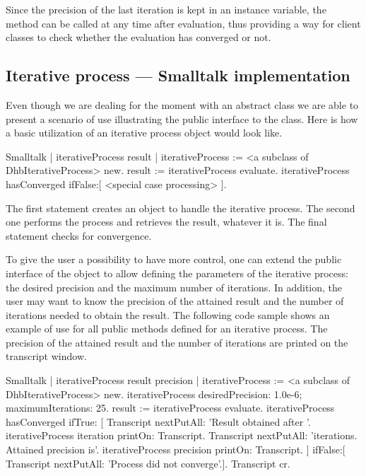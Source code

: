 Since the precision of the last iteration is kept in an instance
variable, the method  can be called at any time
after evaluation, thus providing a way for client classes to check
whether the evaluation has converged or not.

\subsection{Iterative process --- Smalltalk implementation}
\label{sec:siteration}
Even though we are dealing for the moment
with an abstract class we are able to present a scenario of use
illustrating the public interface to the class. Here is how a
basic utilization of an iterative process object would look like.
\begin{displaycode}{Smalltalk}
| iterativeProcess result |
iterativeProcess := <a subclass of DhbIterativeProcess> new.
result := iterativeProcess evaluate.
iterativeProcess hasConverged
   ifFalse:[ <special case processing> ].
\end{displaycode}

The first statement creates an object to handle the iterative
process. The second one performs the process and retrieves the
result, whatever it is. The final statement checks for
convergence.

To give the user a possibility to have more control, one can
extend the public interface of the object to allow defining the
parameters of the iterative process: the desired precision and the
maximum number of iterations. In addition, the user may want to
know the precision of the attained result and the number of
iterations needed to obtain the result. The following code sample
shows an example of use for all public methods defined for an
iterative process. The precision of the attained result and the
number of iterations are printed on the transcript window.

\begin{displaycode}{Smalltalk}
| iterativeProcess result precision |
iterativeProcess := <a subclass of DhbIterativeProcess> new.
iterativeProcess desiredPrecision: 1.0e-6; maximumIterations: 25.
result := iterativeProcess evaluate.
iterativeProcess hasConverged
   ifTrue: [ Transcript nextPutAll: 'Result obtained after '.
             iterativeProcess iteration printOn: Transcript.
             Transcript nextPutAll: 'iterations. Attained precision is'.
             iterativeProcess precision printOn: Transcript.
             ]
    ifFalse:[ Transcript nextPutAll: 'Process did not converge'.].
Transcript cr.
\end{displaycode}

